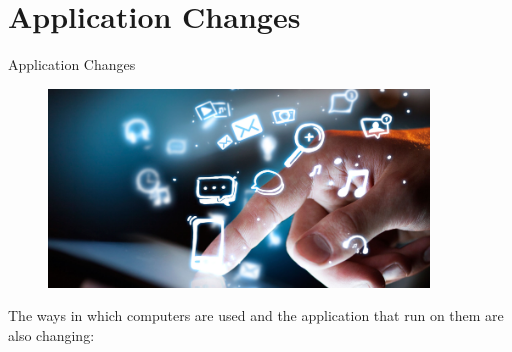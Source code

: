 \documentclass[10pt]{beamer}
\begin{document}
\section{Application Changes}
\begin{frame}{Application Changes}
  \begin{figure}[ht]
    \includegraphics[width=0.9\textwidth, keepaspectratio=true]{images/application.png}
  \end{figure}

  \begin{block}{}
    The ways in which computers are used and the application that run on them
    are also changing:
  \end{block}
\end{frame}
\end{document}
